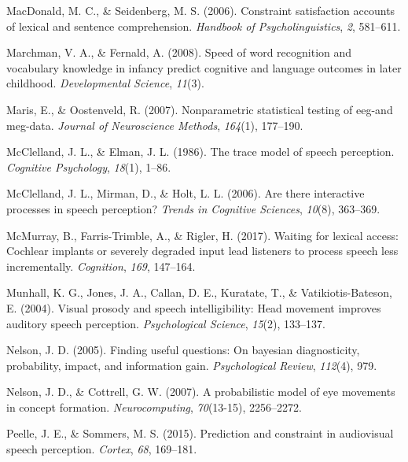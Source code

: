 \documentclass[,man,floatsintext]{apa6}
\begin{document}
\leavevmode\hypertarget{ref-macdonald2006constraint}{}%
MacDonald, M. C., \& Seidenberg, M. S. (2006). Constraint satisfaction accounts of lexical and sentence comprehension. \emph{Handbook of Psycholinguistics}, \emph{2}, 581--611.

\leavevmode\hypertarget{ref-marchman2008speed}{}%
Marchman, V. A., \& Fernald, A. (2008). Speed of word recognition and vocabulary knowledge in infancy predict cognitive and language outcomes in later childhood. \emph{Developmental Science}, \emph{11}(3).

\leavevmode\hypertarget{ref-maris2007nonparametric}{}%
Maris, E., \& Oostenveld, R. (2007). Nonparametric statistical testing of eeg-and meg-data. \emph{Journal of Neuroscience Methods}, \emph{164}(1), 177--190.

\leavevmode\hypertarget{ref-mcclelland1986trace}{}%
McClelland, J. L., \& Elman, J. L. (1986). The trace model of speech perception. \emph{Cognitive Psychology}, \emph{18}(1), 1--86.

\leavevmode\hypertarget{ref-mcclelland2006there}{}%
McClelland, J. L., Mirman, D., \& Holt, L. L. (2006). Are there interactive processes in speech perception? \emph{Trends in Cognitive Sciences}, \emph{10}(8), 363--369.

\leavevmode\hypertarget{ref-mcmurray2017waiting}{}%
McMurray, B., Farris-Trimble, A., \& Rigler, H. (2017). Waiting for lexical access: Cochlear implants or severely degraded input lead listeners to process speech less incrementally. \emph{Cognition}, \emph{169}, 147--164.

\leavevmode\hypertarget{ref-munhall2004visual}{}%
Munhall, K. G., Jones, J. A., Callan, D. E., Kuratate, T., \& Vatikiotis-Bateson, E. (2004). Visual prosody and speech intelligibility: Head movement improves auditory speech perception. \emph{Psychological Science}, \emph{15}(2), 133--137.

\leavevmode\hypertarget{ref-nelson2005finding}{}%
Nelson, J. D. (2005). Finding useful questions: On bayesian diagnosticity, probability, impact, and information gain. \emph{Psychological Review}, \emph{112}(4), 979.

\leavevmode\hypertarget{ref-nelson2007probabilistic}{}%
Nelson, J. D., \& Cottrell, G. W. (2007). A probabilistic model of eye movements in concept formation. \emph{Neurocomputing}, \emph{70}(13-15), 2256--2272.

\leavevmode\hypertarget{ref-peelle2015prediction}{}%
Peelle, J. E., \& Sommers, M. S. (2015). Prediction and constraint in audiovisual speech perception. \emph{Cortex}, \emph{68}, 169--181.
\end{document}
